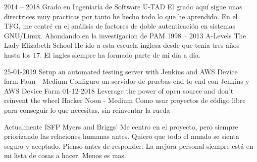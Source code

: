 \documentclass[9pt]{developercv} %
\begin{document}


\begin{entrylist}
	\entry
		{2014 -- 2018}
		{Grado en Ingeniaría de Software}
		{U-TAD}
		{El grado aquí sigue unas directrices muy practicas por tanto he hecho todo lo que he aprendido.
		En el TFG, me centré en el análisis de factores de doble autenticación en sistemas GNU/Linux. Ahondando en la investigacion de PAM}
	\entry
		{1998 -- 2013}
		{A-Levels}
		{The Lady Elizabeth School}
    {He ido a esta escuela inglesa desde que tenia tres años hasta los 17. El ingles siempre ha formado parte de mi día a día.}
\end{entrylist}


\begin{entrylist}
	\entry
		{25-01-2019}
		{Setup an automated testing server with Jenkins and AWS Device farm}
		{Faun - Medium}
		{Configuro un servidor de pruebas end-to-end con Jenkins y AWS Device Farm}
	\entry
		{01-12-2018}
		{Leverage the power of open source and don’t reinvent the wheel}
		{Hacker Noon - Medium}
    {Como usar proyectos de código libre para conseguir lo que necesitas, sin reinventar la rueda}
\end{entrylist}


\begin{entrylist}
	\entry
		{Actualmente}
		{ISFP}
		{Myers and Briggs'}
		{Me centro en el proyecto, pero siempre priorizando las relaciones humanas antes.
		Quiero que todo el mundo se sienta seguro y aceptado.
		Pienso antes de responder.
		La mejora personal siempre está en mi lista de cosas a hacer.
		Menos es mas.}
\end{entrylist}

\end{document}
